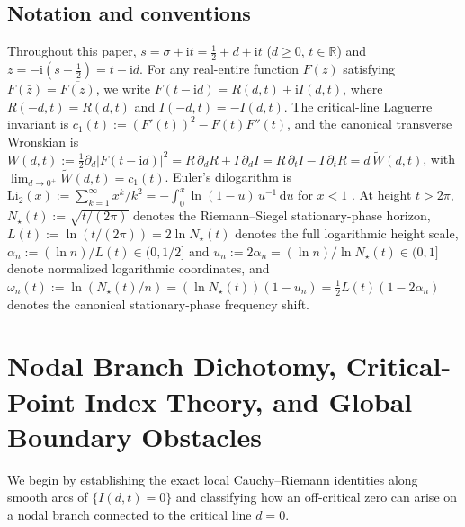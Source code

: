 \documentclass[11pt,reqno]{amsart}
\theoremstyle{definition}
\theoremstyle{remark}
\numberwithin{equation}{section}
\newcommand{\dd}{\mathrm{d}}
\newcommand{\ii}{\mathrm{i}}
\newcommand{\Li}{\mathrm{Li}}
\begin{document}
\subsection{Notation and conventions}\label{subsec:notation}

Throughout this paper, $s = \sigma + \ii t = \frac{1}{2} + d + \ii t$ ($d \ge 0$, $t \in \mathbb{R}$) and $z = -\ii(s-\frac{1}{2}) = t - \ii d$. For any real-entire function $F(z)$ satisfying $F(\bar{z}) = \overline{F(z)}$, we write $F(t-\ii d) = R(d,t) + \ii I(d,t)$, where $R(-d,t)=R(d,t)$ and $I(-d,t)=-I(d,t)$. The critical-line Laguerre invariant is $c_1(t) := (F'(t))^2 - F(t)F''(t)$, and the canonical transverse Wronskian is $W(d,t) := \frac{1}{2}\partial_d|F(t-\ii d)|^2 = R\,\partial_d R + I\,\partial_d I = R\,\partial_t I - I\,\partial_t R = d\,\widetilde{W}(d,t)$, with $\lim_{d\to 0^+}\widetilde{W}(d,t) = c_1(t)$. Euler's dilogarithm is $\Li_2(x) := \sum_{k=1}^\infty x^k/k^2 = -\int_0^x \ln(1-u)\,u^{-1}\,\dd u$ for $x < 1$ \cite{Lewin1981}. At height $t > 2\pi$, $N_\star(t) := \sqrt{t/(2\pi)}$ denotes the Riemann--Siegel stationary-phase horizon, $L(t) := \ln(t/(2\pi)) = 2\ln N_\star(t)$ denotes the full logarithmic height scale, $\alpha_n := (\ln n)/L(t) \in (0,1/2]$ and $u_n := 2\alpha_n = (\ln n)/\ln N_\star(t) \in (0,1]$ denote normalized logarithmic coordinates, and $\omega_n(t) := \ln(N_\star(t)/n) = (\ln N_\star(t))(1 - u_n) = \frac{1}{2}L(t)(1 - 2\alpha_n)$ denotes the canonical stationary-phase frequency shift.

\section{Nodal Branch Dichotomy, Critical-Point Index Theory, and Global Boundary Obstacles}\label{sec:macro}

We begin by establishing the exact local Cauchy--Riemann identities along smooth arcs of $\{I(d,t)=0\}$ and classifying how an off-critical zero can arise on a nodal branch connected to the critical line $d=0$.
\end{document}
